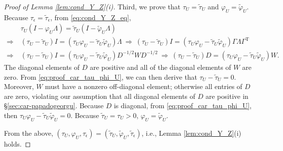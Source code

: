 \documentclass[11pt]{article}
\theoremstyle{definition}
\theoremstyle{remark}
\def\top{{ \mathrm{\scriptscriptstyle T} }}
\begin{document}
\begin{proof}[Proof of Lemma \ref{lem:cond_Y_Z}(i)]
Third, we prove that $\tau_U = \tilde{\tau}_U$ and $\varphi_U = \tilde{\varphi}_U$. 
Because $\tau_{\epsilon} = \tilde{\tau}_{\epsilon}$, 
from \eqref{eq:cond_Y_Z_eq}, 
\begin{align}\label{eq:proof_car_tau_phi_U}
    & \tau_U (I-\varphi_U \Lambda) = \tilde{\tau}_U (I-\tilde{\varphi}_U \Lambda) 
    \nonumber
    \\
    \Longrightarrow \ & 
    (\tau_U - \tilde{\tau}_U) I = ( \tau_U \varphi_U - \tilde{\tau}_U \tilde{\varphi}_U ) \Lambda
    \ \Longrightarrow \ 
    (\tau_U - \tilde{\tau}_U) I = ( \tau_U \varphi_U - \tilde{\tau}_U \tilde{\varphi}_U ) \Gamma \Lambda \Gamma^\top 
    \nonumber
    \\
    \Longrightarrow \ & 
    (\tau_U - \tilde{\tau}_U) I = ( \tau_U \varphi_U - \tilde{\tau}_U \tilde{\varphi}_U ) D^{-1/2} W D^{-1/2}
    \ \Longrightarrow \  
    (\tau_U - \tilde{\tau}_U) D = ( \tau_U \varphi_U - \tilde{\tau}_U \tilde{\varphi}_U ) W.
\end{align}
The diagonal elements of $D$ are positive and all of the diagonal elements of $W$ are zero. From \eqref{eq:proof_car_tau_phi_U}, we can then derive that $\tau_U-\tilde{\tau}_U =0$. 
Moreover, $W$ must have a nonzero off-diagonal element; otherwise all entries of $D$ are zero, violating our assumption that all diagonal elements of $D$ are positive in \S\ref{sec:car-papadogeorgu}. 
Because $D$ is diagonal, 
from \eqref{eq:proof_car_tau_phi_U}, then $\tau_U \varphi_U - \tilde{\tau}_U \tilde{\varphi}_U = 0$. 
Because $\tilde{\tau}_U = \tau_U>0$,  $\varphi_U = \tilde{\varphi}_U$. 


From the above, $(\tau_U, \varphi_U, \tau_{\epsilon}) = (\tilde{\tau}_U, \tilde{\varphi}_U, \tilde{\tau}_{\epsilon})$, i.e., Lemma \ref{lem:cond_Y_Z}(i) holds. 
\end{proof}
\end{document}
